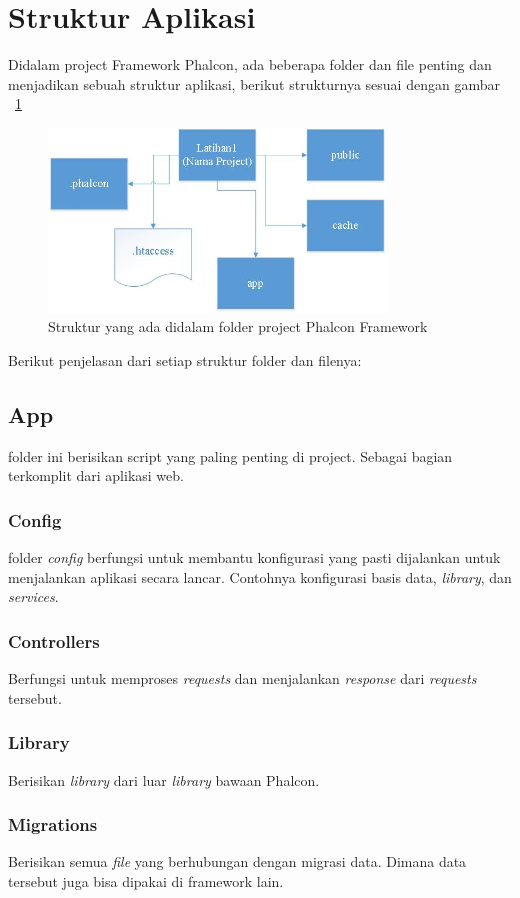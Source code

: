 \section{Struktur Aplikasi}
Didalam project Framework Phalcon, ada beberapa folder dan file penting dan menjadikan sebuah struktur aplikasi, berikut strukturnya sesuai dengan gambar ~\ref{fig:struktur}
\begin{figure}[h!]
\centerline{\includegraphics[width=0.8\textwidth]
{figures/struktur.JPG}}
\caption{Struktur yang ada didalam folder project Phalcon Framework}
\label{fig:struktur}
\end{figure}
Berikut penjelasan dari setiap struktur folder dan filenya:
\subsection{App}
folder ini berisikan script yang paling penting di project. Sebagai bagian terkomplit dari aplikasi web.
\subsubsection{Config}
folder \textit{config} berfungsi untuk membantu konfigurasi yang pasti dijalankan untuk menjalankan aplikasi secara lancar. Contohnya konfigurasi basis data, \textit{library}, dan \textit{services}.
\subsubsection{Controllers}
Berfungsi untuk memproses \textit{requests} dan menjalankan \textit{response} dari \textit{requests} tersebut.
\subsubsection{Library}
Berisikan \textit{library} dari luar \textit{library} bawaan Phalcon.
\subsubsection{Migrations}
Berisikan semua \textit{file} yang berhubungan dengan migrasi data. Dimana data tersebut juga bisa dipakai di framework lain.
